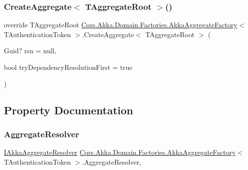 \subsubsection{\texorpdfstring{Create\+Aggregate$<$ T\+Aggregate\+Root $>$()}{CreateAggregate< TAggregateRoot >()}}
{\footnotesize\ttfamily override T\+Aggregate\+Root \hyperlink{classCqrs_1_1Akka_1_1Domain_1_1Factories_1_1AkkaAggregateFactory}{Cqrs.\+Akka.\+Domain.\+Factories.\+Akka\+Aggregate\+Factory}$<$ T\+Authentication\+Token $>$.Create\+Aggregate$<$ T\+Aggregate\+Root $>$ (\begin{DoxyParamCaption}\item[{Guid?}]{rsn = {\ttfamily null},  }\item[{bool}]{try\+Dependency\+Resolution\+First = {\ttfamily true} }\end{DoxyParamCaption})}



\subsection{Property Documentation}
\mbox{\label{classCqrs_1_1Akka_1_1Domain_1_1Factories_1_1AkkaAggregateFactory_ae83aa4aa5cbe5fe0cc0cea41de002218_ae83aa4aa5cbe5fe0cc0cea41de002218}} 
\subsubsection{\texorpdfstring{Aggregate\+Resolver}{AggregateResolver}}
{\footnotesize\ttfamily \hyperlink{interfaceCqrs_1_1Akka_1_1Domain_1_1IAkkaAggregateResolver}{I\+Akka\+Aggregate\+Resolver} \hyperlink{classCqrs_1_1Akka_1_1Domain_1_1Factories_1_1AkkaAggregateFactory}{Cqrs.\+Akka.\+Domain.\+Factories.\+Akka\+Aggregate\+Factory}$<$ T\+Authentication\+Token $>$.Aggregate\+Resolver\hspace{0.3cm}{\ttfamily [get]}, {\ttfamily [protected]}}

